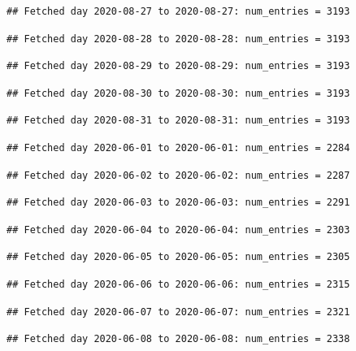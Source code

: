 \documentclass[]{article}
\begin{document}
\begin{verbatim}
## Fetched day 2020-08-27 to 2020-08-27: num_entries = 3193
\end{verbatim}

\begin{verbatim}
## Fetched day 2020-08-28 to 2020-08-28: num_entries = 3193
\end{verbatim}

\begin{verbatim}
## Fetched day 2020-08-29 to 2020-08-29: num_entries = 3193
\end{verbatim}

\begin{verbatim}
## Fetched day 2020-08-30 to 2020-08-30: num_entries = 3193
\end{verbatim}

\begin{verbatim}
## Fetched day 2020-08-31 to 2020-08-31: num_entries = 3193
\end{verbatim}

\begin{verbatim}
## Fetched day 2020-06-01 to 2020-06-01: num_entries = 2284
\end{verbatim}

\begin{verbatim}
## Fetched day 2020-06-02 to 2020-06-02: num_entries = 2287
\end{verbatim}

\begin{verbatim}
## Fetched day 2020-06-03 to 2020-06-03: num_entries = 2291
\end{verbatim}

\begin{verbatim}
## Fetched day 2020-06-04 to 2020-06-04: num_entries = 2303
\end{verbatim}

\begin{verbatim}
## Fetched day 2020-06-05 to 2020-06-05: num_entries = 2305
\end{verbatim}

\begin{verbatim}
## Fetched day 2020-06-06 to 2020-06-06: num_entries = 2315
\end{verbatim}

\begin{verbatim}
## Fetched day 2020-06-07 to 2020-06-07: num_entries = 2321
\end{verbatim}

\begin{verbatim}
## Fetched day 2020-06-08 to 2020-06-08: num_entries = 2338
\end{verbatim}
\end{document}
